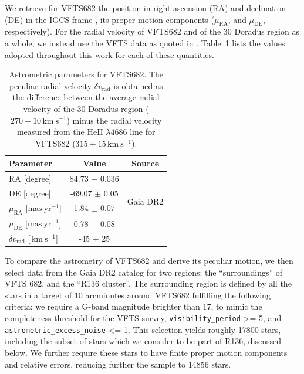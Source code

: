 \documentclass{aa}
\newcommand{\kms}{{\,\mathrm{km\ s^{-1}}}}
\DeclareRobustCommand{\Tabref}[1]{Table~\ref{#1}}
\begin{document}
We retrieve for VFTS682 the position in right ascension (RA) and declination (DE)
in the IGCS frame \cite[][]{brown:18}, its
proper motion components ($\mu_\mathrm{RA}$, and $\mu_\mathrm{DE}$,
respectively). For the radial velocity of VFTS682 and of the 30 Doradus
region as a whole, we instead use the VFTS data
as quoted in \cite{bestenlehner:11}. \Tabref{tab:vfts682} lists the values adopted throughout
this work for each of these quantities.

\begin{table}[tbp]
  \centering
    \caption{Astrometric parameters for VFTS682. The peculiar radial
    velocity $\delta v_\mathrm{rad}$ is obtained as the difference
    between the average radial velocity of the 30 Doradus region
    ($270\pm10\kms$) minus the radial velocity measured from the HeII $\lambda4686$
    line for VFTS682 ($315\pm15\kms$).}

  \begin{tabular}[htbp]{l|c|c}
    Parameter & Value & Source\\ \hline\hline
    RA \hfill[degree] &  84.73 $\pm$  0.036 & \multirow{4}{*}{Gaia DR2}\\
    DE \hfill [degree] & -69.07 $\pm$  0.05  & \\
    $\mu_\mathrm{RA}$  \hfill[$\mathrm{mas\ yr^{-1}}$] & 1.84 $\pm$ 0.07 & \\
    $\mu_\mathrm{DE}$  \hfill[$\mathrm{mas\ yr^{-1}}$] & 0.78 $\pm$ 0.08& \\
    $\delta v_\mathrm{rad}$  \hfill[$\kms$] & -45 $\pm$ 25 & \cite{bestenlehner:11}\\
    \hline
  \end{tabular}
  \label{tab:vfts682}
\end{table}

To compare the astrometry of VFTS682 and derive its peculiar motion,
we then select data from the Gaia DR2 catalog for two regions: the
``surroundings'' of VFTS 682, and the ``R136 cluster''. The
surrounding region is defined by all the stars in a target of 10 arcminutes around
VFTS682 fulfilling the following criteria: we require a G-band
magnitude brighter than 17, to mimic the completeness threshold for
the VFTS survey, \texttt{visibility\_period} >= 5, and
\texttt{astrometric\_excess\_noise} <= 1. This selection yields
roughly 17800 stars, including the subset of stars which we consider to be
part of R136, discussed below. We further require  these stars to have finite proper
motion components and relative errors, reducing further the sample to
14856 stars. %
\end{document}
